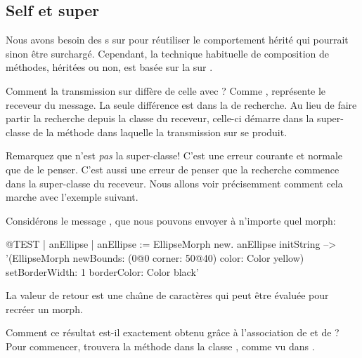 \documentclass[a4paper,10pt,twoside]{book}
\begin{document}

\subsection{Self et super}

Nous avons besoin des s sur \super pour 
r\'eutiliser le comportement h\'erit\'e qui pourrait sinon \^etre
surcharg\'e.
Cependant, la technique habituelle de composition de m\'ethodes,
h\'erit\'ees ou non, est bas\'ee sur la  sur
\self.

Comment la transmission sur \self diff\`ere de celle avec \super?
Comme \self, \super repr\'esente le receveur du message.
La seule diff\'erence est dans la  de recherche.
Au lieu de faire partir la recherche depuis la classe du receveur,
celle-ci d\'emarre dans la super-classe de la m\'ethode dans laquelle la
transmission sur \super se produit. 

Remarquez que \super n'est \emph{pas} la super-classe!
C'est une erreur courante et normale que de le penser.
C'est aussi une erreur de penser que la recherche commence dans la super-classe du receveur.
Nous allons voir pr\'ecisemment comment cela marche avec l'exemple suivant.

Consid\'erons le message , que nous pouvons envoyer \`a 
n'importe quel morph:
\begin{code}{@TEST | anEllipse | anEllipse := EllipseMorph new.}
anEllipse initString --> '(EllipseMorph newBounds: (0@0 corner: 50@40) color: Color yellow) setBorderWidth: 1 borderColor: Color black'
\end{code}
La valeur de retour est une cha\^{\i}ne de caract\`eres qui peut \^etre
\'evalu\'ee pour recr\'eer un morph.

Comment ce r\'esultat est-il exactement obtenu gr\^ace \`a l'association
de \self et de \super?
Pour commencer, 
 trouvera la m\'ethode  dans la 
classe ,
comme vu dans .
\end{document}
